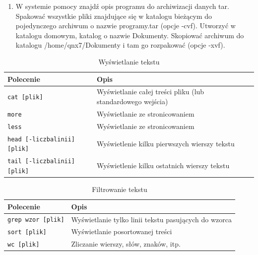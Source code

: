 \documentclass[11pt,twoside,a4paper]{article}
\newenvironment{myenumerate}
{ \begin{enumerate}
    \setlength{\itemsep}{0pt}
    \setlength{\parskip}{0pt}
    \setlength{\parsep}{0pt}     }
{ \end{enumerate}                  }
\begin{document}
\begin{myenumerate}
\item W systemie pomocy znajdź opis programu do archiwizacji danych tar. Spakować wszystkie pliki znajdujące się w katalogu bieżącym do pojedynczego archiwum o nazwie programy.tar (opcje -cvf). Utworzyć w katalogu domowym, katalog o nazwie Dokumenty. Skopiować archiwum do katalogu /home/qnx7/Dokumenty i tam go rozpakować (opcje -xvf). 
\end{myenumerate}

\clearpage 












\begin{table}[h!]
\centering
\caption{Wyświetlanie tekstu}
\setlength{\arrayrulewidth}{1pt}
\setlength{\tabcolsep}{6pt}
\renewcommand{\arraystretch}{1.2}
\begin{tabular}{ |p{}|p{}|}
\hline \rowcolor{gray}
\textbf{Polecenie} & \textbf{Opis} \\ \hline
\mbox{\lstinline{cat [plik]}} & Wyświetlanie całej treści pliku (lub standardowego wejścia) \\ \hline 
\mbox{\lstinline{more}} & Wyświetlanie ze stronicowaniem \\ \hline 
\mbox{\lstinline{less}} & Wyświetlanie ze stronicowaniem \\ \hline 
\mbox{\lstinline{head [-liczbalinii] [plik]}}  & Wyświetlenie kilku pierwszych wierszy tekstu \\ \hline
\mbox{\lstinline{tail [-liczbalinii] [plik]}}  & Wyświetlenie kilku ostatnich wierszy tekstu \\ \hline
\end{tabular}
\label{tab:wyswietl}
\end{table}

\begin{table}[h!]
\centering
\caption{Filtrowanie tekstu}
\setlength{\arrayrulewidth}{1pt}
\setlength{\tabcolsep}{6pt}
\renewcommand{\arraystretch}{1.2}
\begin{tabular}{ |p{}|p{}|}
\hline \rowcolor{gray}
\textbf{Polecenie} & \textbf{Opis} \\ \hline
\mbox{\lstinline{grep wzor [plik]}} & Wyświetlanie tylko linii tekstu pasujących do wzorca \\ \hline 
\mbox{\lstinline{sort [plik]}} & Wyświetlanie posortowanej treści \\ \hline 
\mbox{\lstinline{wc [plik]}} & Zliczanie wierszy, słów, znaków, itp. \\ \hline 
\end{tabular}
\label{tab:filtruj}
\end{table}
\end{document}
